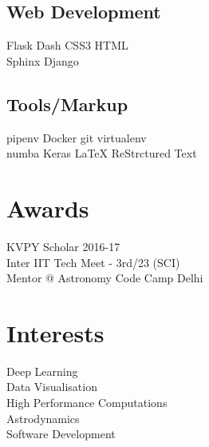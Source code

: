 \documentclass[a4paper]{deedy-resume-openfont}
\begin{document}
\begin{minipage}[t]{0.33\textwidth}
\subsection{Web Development}
Flask \textbullet{}  Dash \textbullet{} CSS3 \textbullet{} HTML\\
Sphinx \textbullet{} Django\\
\subsection{Tools/Markup}
pipenv  \textbullet{} Docker\textbullet{} 
git \textbullet{}  virtualenv \\  numba \textbullet{} Keras\textbullet{}
\LaTeX \textbullet{} ReStrctured Text \\
\section{Awards}
KVPY Scholar 2016-17\\
Inter IIT Tech Meet - 3rd/23 (SCI)\\
Mentor @ Astronomy Code Camp Delhi

\section{Interests}
Deep Learning\\
Data Visualisation\\
High Performance Computations\\
Astrodynamics\\
Software Development

%
%

\end{minipage} 
\hfill
\end{document}
